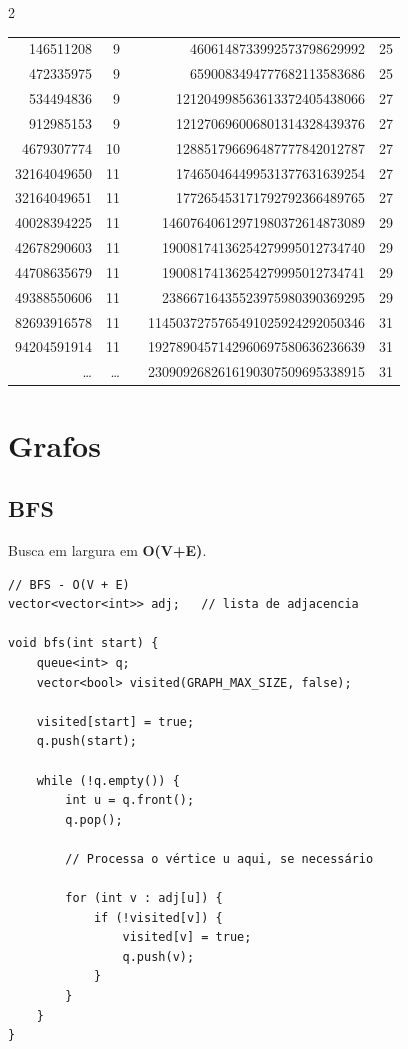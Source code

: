 \documentclass[11pt]{article}
\begin{document}
\begin{multicols}{2}
{\begin{tabular}{|r|r|c|r|r|}
146511208 & 9 && 4606148733992573798629992 & 25 \\
472335975 & 9 && 6590083494777682113583686 & 25 \\
534494836 & 9 && 121204998563613372405438066 & 27 \\
912985153 & 9 && 121270696006801314328439376 & 27 \\
4679307774 & 10 && 128851796696487777842012787 & 27 \\
32164049650 & 11 && 174650464499531377631639254 & 27 \\
32164049651 & 11 && 177265453171792792366489765 & 27 \\
40028394225 & 11 && 14607640612971980372614873089 & 29 \\
42678290603 & 11 && 19008174136254279995012734740 & 29 \\
44708635679 & 11 && 19008174136254279995012734741 & 29 \\
49388550606 & 11 && 23866716435523975980390369295 & 29 \\
82693916578 & 11 && 1145037275765491025924292050346 & 31 \\
94204591914 & 11 && 1927890457142960697580636236639 & 31 \\
\dots & \dots && 2309092682616190307509695338915 & 31 \\
\hline
\end{tabular}%
}


\section{Grafos}

\subsection{BFS}
Busca em largura em \textbf{O(V+E)}.
\begin{lstlisting}
// BFS - O(V + E)
vector<vector<int>> adj;   // lista de adjacencia

void bfs(int start) {
    queue<int> q;
    vector<bool> visited(GRAPH_MAX_SIZE, false);

    visited[start] = true;
    q.push(start);

    while (!q.empty()) {
        int u = q.front();
        q.pop();

        // Processa o vértice u aqui, se necessário

        for (int v : adj[u]) {
            if (!visited[v]) {
                visited[v] = true;
                q.push(v);
            }
        }
    }
}
\end{lstlisting}


\end{multicols}
\end{document}
